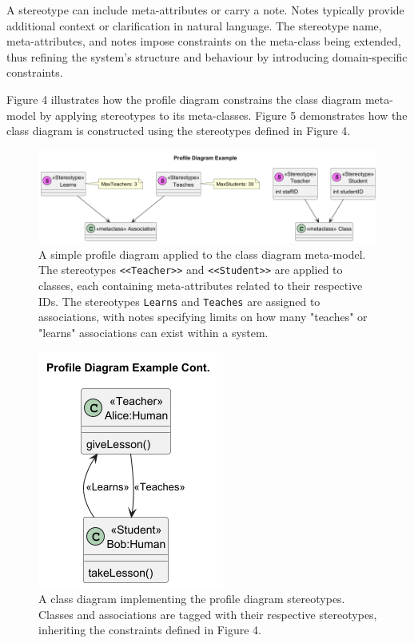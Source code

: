 \documentclass{article}
\begin{document}
{A stereotype can include meta-attributes or carry a note. Notes typically provide additional context or clarification in natural language. The stereotype name, meta-attributes, and notes impose constraints on the meta-class being extended, thus refining the system's structure and behaviour by introducing domain-specific constraints\cite{Seidl_Scholz_Huemer_Kappel_Duffy_2014}. 

Figure 4 illustrates how the profile diagram constrains the class diagram meta-model by applying stereotypes to its meta-classes. Figure 5 demonstrates how the class diagram is constructed using the stereotypes defined in Figure 4.

\begin{figure}[H]
    \centering
    \includegraphics[width=1\linewidth]{PDExample-Profile_Diagram_Example.png}
    \caption{A simple profile diagram applied to the class diagram meta-model. The stereotypes \texttt{<<Teacher>>} and \texttt{<<Student>>} are applied to classes, each containing meta-attributes related to their respective IDs. The stereotypes \texttt{Learns} and \texttt{Teaches} are assigned to associations, with notes specifying limits on how many "teaches" or "learns" associations can exist within a system.}
    \label{fig:Simple PD 1}
\end{figure}

\begin{figure}[H]
    \centering
    \includegraphics[width=0.3\linewidth]{PDExample2.png}
    \caption{A class diagram implementing the profile diagram stereotypes. Classes and associations are tagged with their respective stereotypes, inheriting the constraints defined in Figure 4.}
    \label{fig:Simple PD 2}
\end{figure}

}
\end{document}
